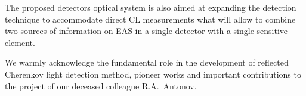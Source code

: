 \documentclass[a4paper,11pt]{article}
\begin{document}
The proposed detectors optical system is also aimed at expanding the detection technique to accommodate direct CL measurements what will allow to combine two sources of information on EAS in a single detector with a single sensitive element.


\acknowledgments
We warmly acknowledge the fundamental role in the development of reflected Cherenkov light detection method, pioneer works and important contributions to the project of our deceased colleague R.A.~Antonov.




%


\end{document}
